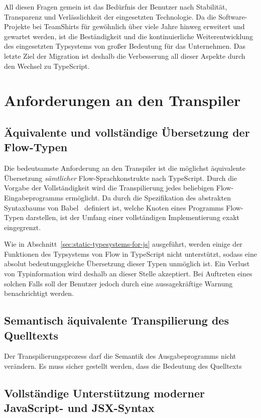 All diesen Fragen gemein ist das Bedürfnis der Benutzer nach Stabilität, Transparenz und Verlässlichkeit der eingesetzten Technologie. Da die Software-Projekte bei TeamShirts für gewöhnlich über viele Jahre hinweg erweitert und gewartet werden, ist die Beständigkeit und die kontinuierliche Weiterentwicklung des eingesetzten Typsystems von großer Bedeutung für das Unternehmen. Das letzte Ziel der Migration ist deshalb die Verbesserung all dieser Aspekte durch den Wechsel zu TypeScript.

\section{Anforderungen an den Transpiler}

\subsection{Äquivalente und vollständige Übersetzung der Flow-Typen}
\label{subsection:requirement:correct-translation}

Die bedeutsamste Anforderung an den Transpiler ist die möglichst äquivalente Übersetzung \emph{sämtlicher} Flow-Sprachkonstrukte nach TypeScript. Durch die Vorgabe der Vollständigkeit wird die Transpilierung jedes beliebigen Flow-Eingabeprogramms ermöglicht. Da durch die Spezifikation des abstrakten Syntaxbaums von Babel~\autocite{BABEL:PARSER_SPEC} definiert ist, welche Knoten eines Programms Flow-Typen darstellen, ist der Umfang einer vollständigen Implementierung exakt eingegrenzt.

Wie in Abschnitt~\ref{sec:static-typesystems-for-js} ausgeführt, werden einige der Funktionen des Typsystems von Flow in TypeScript nicht unterstützt, sodass eine absolut bedeutungsgleiche Übersetzung dieser Typen unmöglich ist. Ein Verlust von Typinformation wird deshalb an dieser Stelle akzeptiert. Bei Auftreten eines solchen Falls soll der Benutzer jedoch durch eine aussagekräftige Warnung benachrichtigt werden.

\subsection{Semantisch äquivalente Transpilierung des Quelltexts}
\label{subsection:requirement:semantic-equivalence}

Der Transpilierungsprozess darf die Semantik des Ausgabeprogramms nicht verändern. Es muss sicher gestellt werden, dass die Bedeutung des Quelltexts

\subsection{Vollständige Unterstützung moderner JavaScript- und JSX-Syntax}
\label{subsection:requirement:modern-js-support}

